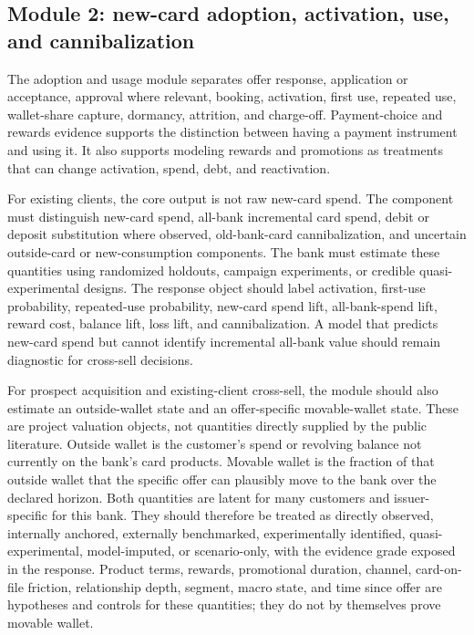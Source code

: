 \documentclass[11pt]{article}
\newcommand{\1}{\mathbf{1}}
\begin{document}
\subsection{Module 2: new-card adoption, activation, use, and cannibalization}
\label{subsec:module-adoption-use}

The adoption and usage module separates offer response, application or
acceptance, approval where relevant, booking, activation, first use, repeated
use, wallet-share capture, dormancy, attrition, and charge-off. Payment-choice
and rewards evidence supports the distinction between having a payment
instrument and using it. It also supports modeling rewards and promotions as
treatments that can change activation, spend, debt, and reactivation.

For existing clients, the core output is not raw new-card spend. The component
must distinguish new-card spend, all-bank incremental card spend, debit or
deposit substitution where observed, old-bank-card cannibalization, and
uncertain outside-card or new-consumption components. The bank must estimate
these quantities using randomized holdouts, campaign experiments, or credible
quasi-experimental designs. The response object should label activation,
first-use probability, repeated-use probability, new-card spend lift,
all-bank-spend lift, reward cost, balance lift, loss lift, and
cannibalization. A model that predicts new-card spend but cannot identify
incremental all-bank value should remain diagnostic for cross-sell decisions.

For prospect acquisition and existing-client cross-sell, the module should also
estimate an outside-wallet state and an offer-specific movable-wallet state.
These are project valuation objects, not quantities directly supplied by the
public literature. Outside wallet is the customer's spend or revolving balance
not currently on the bank's card products. Movable wallet is the fraction of
that outside wallet that the specific offer can plausibly move to the bank over
the declared horizon. Both quantities are latent for many customers and
issuer-specific for this bank. They should therefore be treated as directly
observed, internally anchored, externally benchmarked, experimentally
identified, quasi-experimental, model-imputed, or scenario-only, with the
evidence grade exposed in the response. Product terms, rewards, promotional
duration, channel, card-on-file friction, relationship depth, segment, macro
state, and time since offer are hypotheses and controls for these quantities;
they do not by themselves prove movable wallet.
\end{document}
